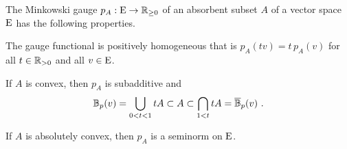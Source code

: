 \begin{proposition}\label{thm:properties-gauge-functional-absorbent-set}
  The Minkowski gauge $p_A :\mathrm{E} \to \mathbb{R}_{\geq 0}$ of an absorbent subset $A$
  of a vector space $\mathrm{E}$  has the following properties.  
  \begin{romanlist}
  \item\label{ite:gauge-functional-positively-homogenous} 
    The gauge functional is positively homogeneous that is
    $p_A (t v) = t\,  p_A(v)$ for all $t\in \mathbb{R}_{> 0}$ and all $v\in \mathrm{E}$.
  \item\label{ite:gauge-functional-subadditivity}
     If $A$ is convex, then $p_A$ is subadditive and 
  \[
    \mathbb{B}_p (v)= \bigcup_{0< t < 1} tA \subset A \subset
    \bigcap_{1< t} tA = \overline{\mathbb{B}}_p (v)  \ .
  \]
\item\label{ite:gauge-functional-seminorm}
  If $A$ is absolutely convex, then $p_A$ is a seminorm on $\mathrm{E}$.
  \end{romanlist}
\end{proposition}

